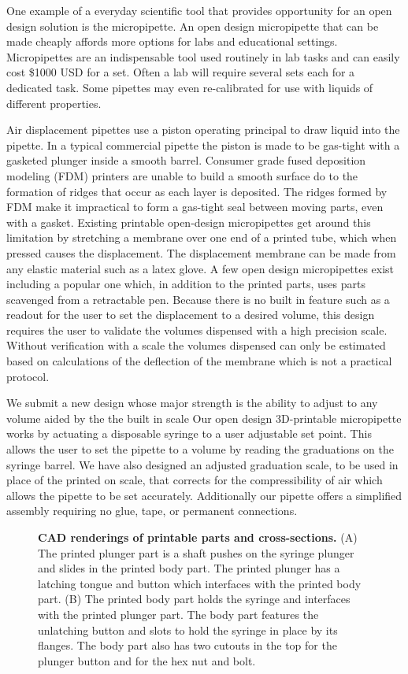 \documentclass{nature}
\begin{document}
One example of a everyday scientific tool that provides opportunity for an open design solution is the micropipette.
An open design micropipette that can be made cheaply affords more options for labs and educational settings.
Micropipettes are an indispensable tool used routinely in lab tasks and can easily cost \$1000 USD for a set.
Often a lab will require several sets each for a dedicated task.
Some pipettes may even re-calibrated for use with liquids of different properties.

Air displacement pipettes use a piston operating principal to draw liquid into the pipette\cite{ISO8655}.
In a typical commercial pipette the piston is made to be gas-tight with a gasketed plunger inside a smooth barrel.
Consumer grade fused deposition modeling (FDM) printers are unable to build a smooth surface do to the formation of ridges that occur as each layer is deposited.
The ridges formed by FDM make it impractical to form a gas-tight seal between moving parts, even with a gasket.
Existing printable open-design micropipettes get around this limitation by stretching a membrane over one end of a printed tube, which when pressed causes the displacement.
The displacement membrane can be made from any elastic material such as a latex glove.
A few open design micropipettes exist including a popular one which, in addition to the printed parts, uses parts scavenged from a retractable pen\cite{Baden2014}.
Because there is no built in feature such as a readout for the user to set the displacement to a desired volume, this design requires the user to validate the volumes dispensed with a high precision scale.
Without verification with a scale the volumes dispensed can only be estimated based on calculations of the deflection of the membrane which is not a practical protocol.

We submit a new design whose major strength is the ability to adjust to any volume aided by the the built in scale
Our open design 3D-printable micropipette works by actuating a disposable syringe to a user adjustable set point.
This allows the user to set the pipette to a volume by reading the graduations on the syringe barrel.
We have also designed an adjusted graduation scale, to be used in place of the printed on scale, that corrects for the compressibility of air which allows the pipette to be set accurately.
Additionally our pipette offers a simplified assembly requiring no glue, tape, or permanent connections.

\begin{figure}
\caption{
{\bf CAD renderings of printable parts and cross-sections.} (A) The printed plunger part is a shaft pushes on the syringe plunger and slides in the printed body part. The printed plunger has a latching tongue and button which interfaces with the printed body part. (B) The printed body part holds the syringe and interfaces with the printed plunger part. The body part features the unlatching button and slots to hold the syringe in place by its flanges. The body part also has two cutouts in the top for the plunger button and for the hex nut and bolt.
}
\label{fig1}
\end{figure}
\end{document}
